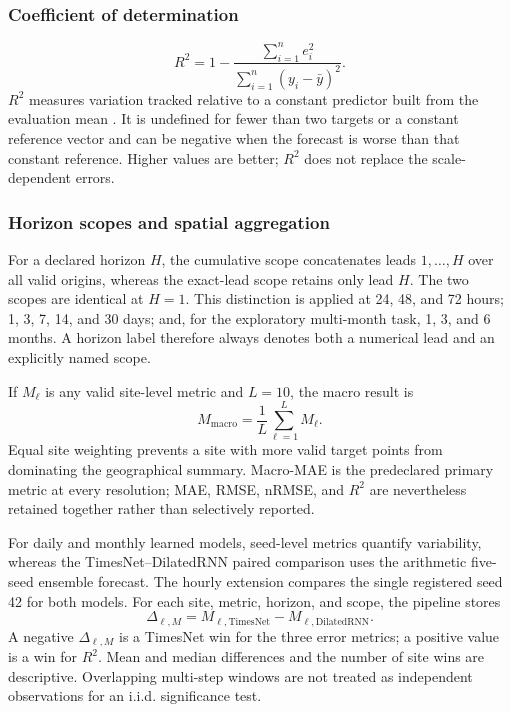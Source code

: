 \subsubsection{Coefficient of determination}

\begin{equation}
 R^2
 =
 1-
 \frac{\sum_{i=1}^{n}e_i^2}
      {\sum_{i=1}^{n}(y_i-\bar{y})^2}.
 \label{eq:r2}
\end{equation}
$R^2$ measures variation tracked relative to a constant predictor built from
the evaluation mean \cite{yang2020verification}. It is undefined for fewer
than two targets or a constant reference vector and can be negative when the
forecast is worse than that constant reference. Higher values are better;
$R^2$ does not replace the scale-dependent errors.

\subsubsection{Horizon scopes and spatial aggregation}

For a declared horizon $H$, the cumulative scope concatenates leads
$1,\ldots,H$ over all valid origins, whereas the exact-lead scope retains only
lead $H$. The two scopes are identical at $H=1$. This distinction is applied at
24, 48, and 72 hours; 1, 3, 7, 14, and 30 days; and, for the exploratory
multi-month task, 1, 3, and 6 months. A horizon label therefore always denotes
both a numerical lead and an explicitly named scope.

If $M_{\ell}$ is any valid site-level metric and $L=10$, the macro result is
\begin{equation}
 M_{\mathrm{macro}}
 =
 \frac{1}{L}\sum_{\ell=1}^{L}M_{\ell}.
 \label{eq:macro_metric}
\end{equation}
Equal site weighting prevents a site with more valid target points from
dominating the geographical summary. Macro-MAE is the predeclared primary
metric at every resolution; MAE, RMSE, nRMSE, and $R^2$ are nevertheless
retained together rather than selectively reported.

For daily and monthly learned models, seed-level metrics quantify variability,
whereas the TimesNet--DilatedRNN paired comparison uses the arithmetic
five-seed ensemble forecast. The hourly extension compares the single
registered seed 42 for both models. For each site, metric, horizon, and scope,
the pipeline stores
\begin{equation}
 \Delta_{\ell,M}
 =
 M_{\ell,\mathrm{TimesNet}}-M_{\ell,\mathrm{DilatedRNN}}.
 \label{eq:paired_difference}
\end{equation}
A negative $\Delta_{\ell,M}$ is a TimesNet win for the three error metrics; a
positive value is a win for $R^2$. Mean and median differences and the number
of site wins are descriptive. Overlapping multi-step windows are not treated
as independent observations for an i.i.d. significance test.
